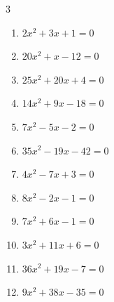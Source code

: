 \begin{multicols}{3}
\begin{enumerate}

  \item $2x^{2}+3x+1=0$


  \item $20x^{2}+x-12=0$


  \item $25x^{2}+20x+4=0$


\columnbreak %

\resetques

  \item $14x^{2}+9x-18=0$


  \item $7x^{2}-5x-2=0$


  \item $35x^{2}-19x-42=0$


  \item $4x^{2}-7x+3=0$


  \item $8x^{2}-2x-1=0$


  \item $7x^{2}+6x-1=0$


  \item $3x^{2}+11x+6=0$


  \item $36x^{2}+19x-7=0$


  \item $9x^{2}+38x-35=0$



\end{enumerate}
\end{multicols}

